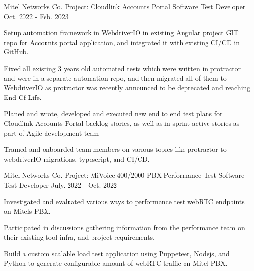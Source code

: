

\begin{cventries}

  \cventry
    { Mitel Networks Co.} %
    { Project: Cloudlink Accounts Portal } %
    { Software Test Developer } %
    { Oct. 2022 - Feb. 2023 } %
    {
      \begin{cvitems} %
	 	\item { Setup automation framework in WebdriverIO in existing Angular project GIT repo for Accounts portal application, and integrated it with existing CI/CD in GitHub.
	 	}
	    \item { Fixed all existing 3 years old automated tests which were written in protractor and were in a separate automation repo, and then migrated all of them to WebdriverIO as protractor was recently announced to be deprecated and reaching End Of Life. }
        \item { Planed and wrote, developed and executed new end to end test plans for Cloudlink Accounts Portal backlog stories, as well as in sprint active stories as part of Agile development team }
        \item { Trained and onboarded team members on various topics like protractor to webdriverIO migrations, typescript, and CI/CD.
        }     
      \end{cvitems}
    }

	\cventry
		{ Mitel Networks Co. } %
		{ Project: MiVoice 400/2000 PBX Performance Test } %
		{ Software Test Developer } %
		{ July. 2022 - Oct. 2022 } %
		{
			\begin{cvitems} %
				\item { Investigated and evaluated various ways to performance test webRTC endpoints on Mitels PBX.
				}
				\item { Participated in discussions gathering information from the performance team on their existing tool infra, and project requirements.
				}
				\item { Build a custom scalable load test application using Puppeteer, Nodejs, and Python to generate configurable amount of webRTC traffic on Mitel PBX.
				}
			\end{cvitems}
		}


\end{cventries}
